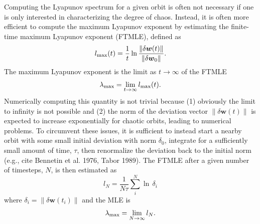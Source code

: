 \documentclass[letterpaper,12pt,preprint]{aastex}
\newcommand{\bs}[1]{\boldsymbol{#1}}
\begin{document}
Computing the Lyapunov spectrum for a given orbit is often not necessary if one is only interested in characterizing the degree of chaos. Instead, it is often more efficient to compute the maximum Lyapunov exponent by estimating the finite-time maximum Lyapunov exponent (FTMLE), defined as 
\begin{equation}
	l_{\rm max}(t) = \frac{1}{t}\ln \frac{\|\delta \bs{w}(t)\|}{\|\delta \bs{w}_0\|}.\label{eq:lmax}
\end{equation}
The maximum Lyapunov exponent is the limit as $t\rightarrow \infty$ of the FTMLE
\begin{equation}
	\lambda_{\rm max} = \lim_{t\rightarrow\infty}l_{\rm max}(t). \label{eq:lyapmax}
\end{equation}
Numerically computing this quantity is not trivial because (1) obviously the limit to infinity is not possible and (2) the norm of the deviation vector $\|\delta \bs{w}(t)\|$ is expected to increase exponentially for chaotic orbits, leading to numerical problems. To circumvent these issues, it is sufficient to instead start a nearby orbit with some small initial deviation with norm $\delta_0$, integrate for a sufficiently small amount of time, $\tau$, then renormalize the deviation back to the initial norm (e.g., cite Bennetin et al. 1976, Tabor 1989). 
The FTMLE after a given number of timesteps, $N$, is then estimated as
\begin{equation}
	l_N = \frac{1}{N\tau}\sum_i^N \ln \, \delta_i
\end{equation}
where $\delta_i=\|\delta \bs{w}(t_i)\|$ and the MLE is
\begin{equation}
	\lambda_{\rm max} = \lim_{N\rightarrow \infty} l_N.
\end{equation}
\end{document}
